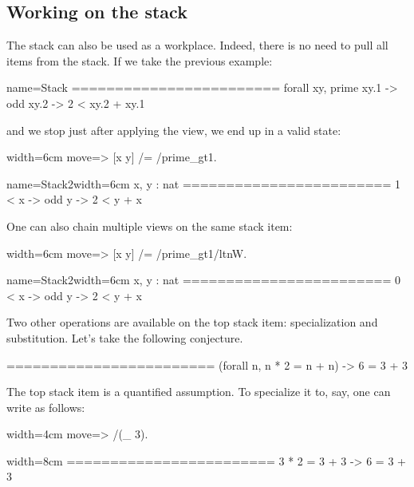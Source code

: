 \subsection{Working on the stack}

The stack can also be used as a workplace.  Indeed, there is no need
to pull all items from the stack.  If we take the previous example:

\begin{coqout}{name=Stack}{}
========================
forall xy, prime xy.1 -> odd xy.2 -> 2 < xy.2 + xy.1
\end{coqout}
and we stop just after applying the view, we end up in a valid state:

\begin{coq-left}{}{width=6cm}
move=> [x y] /= /prime_gt1.
$~$
$~$
\end{coq-left}
\begin{coqout-right}{name=Stack2}{width=6cm}
 x, y : nat
 ========================
 1 < x -> odd y -> 2 < y + x
\end{coqout-right}

One can also chain multiple views on the same stack item:

\begin{coq-left}{}{width=6cm}
move=> [x y] /= /prime_gt1/ltnW.
$~$
$~$
\end{coq-left}
\begin{coqout-right}{name=Stack2}{width=6cm}
 x, y : nat
 ========================
 0 < x -> odd y -> 2 < y + x
\end{coqout-right}

Two other operations are available on the top stack item: specialization
and substitution.  Let's take the following conjecture.

\begin{coqout}{}{}
========================
(forall n, n * 2 = n + n) -> 6 = 3 + 3
\end{coqout}

The top stack item is a quantified assumption.  To specialize it to, say,
 one can write as follows:

\begin{coq-left}{}{width=4cm}
move=> /(_ 3).
$~$
\end{coq-left}
\begin{coqout-right}{}{width=8cm}
========================
3 * 2 = 3 + 3 -> 6 = 3 + 3
\end{coqout-right}

